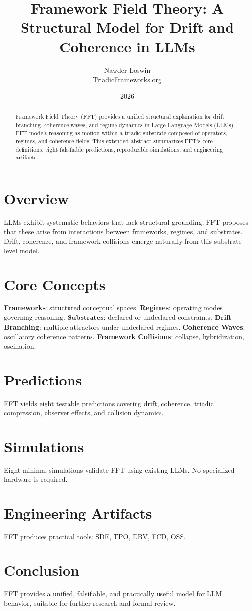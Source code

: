 \documentclass[11pt]{article}
\title{\textbf{Framework Field Theory: A Structural Model for Drift and Coherence in LLMs}}
\author{Nawder Loswin \\ TriadicFrameworks.org}
\date{2026}
\begin{document}
\maketitle

\begin{abstract}
Framework Field Theory (FFT) provides a unified structural explanation for drift branching, coherence waves, and regime dynamics in Large Language Models (LLMs). FFT models reasoning as motion within a triadic substrate composed of operators, regimes, and coherence fields. This extended abstract summarizes FFT's core definitions, eight falsifiable predictions, reproducible simulations, and engineering artifacts.
\end{abstract}

\section{Overview}

LLMs exhibit systematic behaviors that lack structural grounding. FFT proposes that these arise from interactions between frameworks, regimes, and substrates. Drift, coherence, and framework collisions emerge naturally from this substrate-level model.

\section{Core Concepts}

\textbf{Frameworks}: structured conceptual spaces.  
\textbf{Regimes}: operating modes governing reasoning.  
\textbf{Substrates}: declared or undeclared constraints.  
\textbf{Drift Branching}: multiple attractors under undeclared regimes.  
\textbf{Coherence Waves}: oscillatory coherence patterns.  
\textbf{Framework Collisions}: collapse, hybridization, oscillation.

\section{Predictions}

FFT yields eight testable predictions covering drift, coherence, triadic compression, observer effects, and collision dynamics.

\section{Simulations}

Eight minimal simulations validate FFT using existing LLMs. No specialized hardware is required.

\section{Engineering Artifacts}

FFT produces practical tools:  
SDE, TPO, DBV, FCD, OSS.

\section{Conclusion}

FFT provides a unified, falsifiable, and practically useful model for LLM behavior, suitable for further research and formal review.
\end{document}
